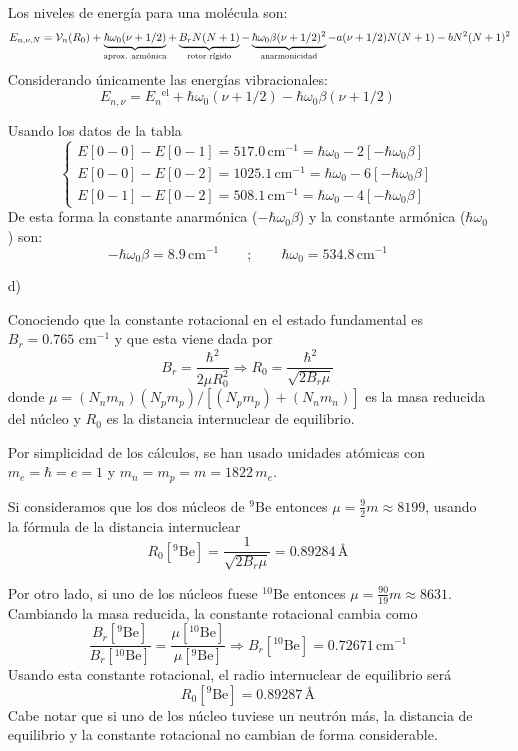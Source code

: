 \documentclass{article}
\begin{document}
\begin{enumerate}
    Los niveles de energía para una molécula son:
    $$
    E_{n,\nu ,N} = \mathcal{V}_n(R_0) + \underbrace{\hbar\omega_0(\nu + 1/2)}_{\text{aprox. armónica}} + \underbrace{B_rN(N+1)}_{\text{{rotor rígido}}} - \underbrace{\hbar\omega_0 \beta (\nu + 1/2)^2}_{\text{anarmonicidad}}- a(\nu + 1/2)N(N+1) - bN^2(N+1)^2
    $$
    Considerando únicamente las energías vibracionales:
    $$
    E_{n,\nu} = E_n{}^\text{el} + \hbar \omega_0(\nu + 1/2) - \hbar \omega_0 \beta (\nu + 1/2)
    $$
    

    Usando los datos de la tabla
    \begin{equation*}
        \begin{cases}
            E[0-0]-E[0-1]=517.0\,\text{cm}^{-1}=\hbar\omega_0-2\left[-\hbar\omega_0\beta\right]\\
            E[0-0]-E[0-2]=1025.1\,\text{cm}^{-1}=\hbar\omega_0-6\left[-\hbar\omega_0\beta\right]\\
            E[0-1]-E[0-2]=508.1\,\text{cm}^{-1}=\hbar\omega_0-4\left[-\hbar\omega_0\beta\right]
        \end{cases}    
    \end{equation*}
    De esta forma la constante anarmónica ($-\hbar\omega_0\beta$) y la constante armónica ($\hbar\omega_0$) son:
    \[
    \boxed{-\hbar\omega_0\beta=8.9\,\text{cm}^{-1}}\qquad;\qquad\boxed{\hbar\omega_0=534.8\,\text{cm}^{-1}}
    \]

    \item[d)] {
    Conociendo que la constante rotacional en el estado fundamental es $B_r=0.765$ cm$^{-1}$ y que esta viene dada por 
    \[B_r=\frac{\hbar^2}{2\mu R_0^2}\Rightarrow R_0=\frac{\hbar^2}{\sqrt{2B_r\mu}}\]
    donde $\mu=(N_n m_n) (N_p m_p)/\left[(N_p m_p)+(N_n m_n)\right]$ es la masa reducida del núcleo y $R_0$ es la distancia internuclear de equilibrio.

    Por simplicidad de los cálculos, se han usado unidades atómicas con $m_e=\hbar=e=1$ y $m_n=m_p=m=1822\,m_e$. 
    
    Si consideramos que los dos núcleos de $^{9}\text{Be}$ entonces $\mu=\frac{9}{2}m\approx8199$, usando la fórmula de la distancia internuclear
    \[
    \boxed{R_0\left[^{9}\text{Be}\right]=\frac{1}{\sqrt{2B_r\mu}}=0.89284\,\text{\AA}}
    \]

    Por otro lado, si uno de los núcleos fuese $^{10}\text{Be}$ entonces $\mu=\frac{90}{19}m\approx8631$. Cambiando la masa reducida, la constante rotacional cambia como 
    \[
    \frac{B_r\left[^{9}\text{Be}\right]}{B_r\left[^{10}\text{Be}\right]}=\frac{\mu\left[^{10}\text{Be}\right]}{\mu\left[^{9}\text{Be}\right]}\Rightarrow \boxed{B_r\left[^{10}\text{Be}\right]=0.72671\,\text{cm}^{-1}}
    \]
    Usando esta constante rotacional, el radio internuclear de equilibrio será
    \[
    \boxed{R_0\left[^{9}\text{Be}\right]=0.89287\,\text{\AA}}
    \]
    Cabe notar que si uno de los núcleo tuviese un neutrón más, la distancia de equilibrio y la constante rotacional no cambian de forma considerable.
    }
\end{enumerate}
\end{document}
